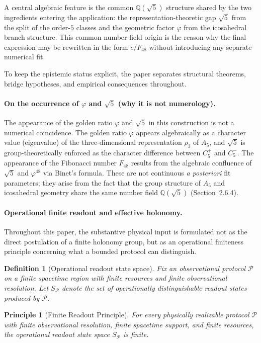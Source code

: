 \documentclass[sn-mathphys-num,Numbered]{sn-jnl}
\theoremstyle{thmstyleone}
\theoremstyle{thmstylethree}
\newtheorem{definition}[theorem]{Definition}
\newtheorem{principle}[theorem]{Principle}
\theoremstyle{thmstyletwo}
\newcommand{\Qsqrt}{\mathbb{Q}(\sqrt{5})}
\begin{document}
A central algebraic feature is the common $\Qsqrt$
structure shared by the two ingredients entering the application:
the representation-theoretic gap $\sqrt{5}$ from the split of the
order-$5$ classes and the geometric factor $\varphi$ from the
icosahedral branch structure. This common number-field origin is the
reason why the final expression may be rewritten in the form
$c/F_{48}$ without introducing any separate numerical fit.

To keep the epistemic status explicit, the paper separates structural
theorems, bridge hypotheses, and empirical consequences throughout.

\paragraph{On the occurrence of $\varphi$ and $\sqrt{5}$ (why it is not numerology).}
The appearance of the golden ratio $\varphi$ and $\sqrt{5}$ in this
construction is not a numerical coincidence. The golden ratio $\varphi$
appears algebraically as a character value (eigenvalue) of the
three-dimensional representation $\rho_3$ of $A_5$, and $\sqrt{5}$ is
group-theoretically enforced as the character difference between
$C_5^+$ and $C_5^-$. The appearance of the Fibonacci number $F_{48}$
results from the algebraic confluence of $\sqrt{5}$ and $\varphi^{48}$
via Binet's formula. These are not continuous \emph{a posteriori} fit
parameters; they arise from the fact that the group structure of $A_5$
and icosahedral geometry share the same number field $\Qsqrt$
(Section~2.6.4).

\paragraph{Operational finite readout and effective holonomy.}
Throughout this paper, the substantive physical input is formulated not
as the direct postulation of a finite holonomy group, but as an
operational finiteness principle concerning what a bounded protocol can
distinguish.

\begin{definition}[Operational readout state space]
\label{def:readout-state-space}
Fix an observational protocol $\mathcal P$ on a finite spacetime region
with finite resources and finite observational resolution. Let
$S_{\mathcal P}$ denote the set of operationally distinguishable
readout states produced by $\mathcal P$.
\end{definition}

\begin{principle}[Finite Readout Principle]
\label{prin:frp}
For every physically realizable protocol $\mathcal P$ with finite
observational resolution, finite spacetime support, and finite
resources, the operational readout state space $S_{\mathcal P}$ is
finite.
\end{principle}
\end{document}
